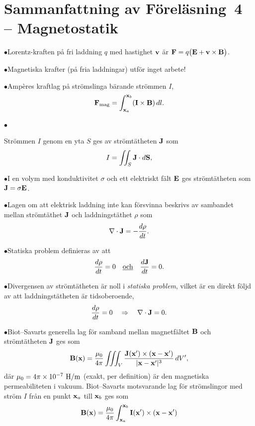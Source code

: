 {{{\section{Sammanfattning av F{\"o}rel{\"a}sning~4 -- Magnetostatik}
\item{$\bullet$}{Lorentz-kraften p{\aa} fri laddning $q$ med hastighet
  ${\bf v}$ {\"a}r ${\bf F}=q\big({\bf E}+{\bf v}\times{\bf B}\big)$.}
\item{$\bullet$}{Magnetiska krafter (p{\aa} fria laddningar) utf{\"o}r
  inget arbete!}
\item{$\bullet$}{Amp{\`e}res kraftlag p{\aa} str{\"o}mslinga b{\"a}rande
  str{\"o}mmen $I$,
  $$
    {\bf F}_{\rm mag}=\int^{{\bf x}_b}_{{\bf x}_a} ({\bf I}\times{\bf B})\,dl.
  $$}
\item{$\bullet$}{Str{\"o}mmen $I$ genom en yta $S$ ges av str{\"o}mt{\"a}theten
  ${\bf J}$ som
  $$
    I=\iint_S {\bf J}\cdot d{\bf S},
  $$
\item{$\bullet$}{I en volym med konduktivitet $\sigma$ och ett elektriskt
  f{\"a}lt ${\bf E}$ ges str{\"o}mt{\"a}theten som ${\bf J}=\sigma{\bf E}$.}
\item{$\bullet$}{Lagen om att elektrisk laddning inte kan f{\"o}rsvinna
  beskrivs av sambandet mellan str{\"o}mt{\"a}thet ${\bf J}$ och
  laddningst{\"a}thet $\rho$ som
  $$
    \nabla\cdot{\bf J}=-{{d\rho}\over{dt}}.
  $$}
\item{$\bullet$}{Statiska problem definieras av att
  $$
    {{d\rho}\over{dt}}=0\quad\underline{\hbox{och}}\quad{{d{\bf J}}\over{dt}}=0.
  $$}
\item{$\bullet$}{Divergensen av str{\"o}mt{\"a}theten {\"a}r noll i
  {\it statiska problem}, vilket {\"a}r en direkt f{\"o}ljd av att
  laddnings\-t{\"a}t\-heten {\"a}r tidsoberoende,
  $$
    {{d\rho}\over{dt}}=0\quad\Rightarrow\quad\nabla\cdot{\bf J}=0.
  $$}
\item{$\bullet$}{Biot--Savarts generella lag f{\"o}r samband mellan
  magnetf{\"a}ltet ${\bf B}$ och str{\"o}mt{\"a}theten ${\bf J}$ ges som
  $$
    {\bf B}({\bf x})={{\mu_0}\over{4\pi}}\iiint_V
        {{{\bf J}({\bf x}')\times({\bf x}-{\bf x}')}
          \over{|{\bf x}-{\bf x}'|^3}}\,dV',
  $$
  d{\"a}r $\mu_0=4\pi\times10^{-7}\ {\rm H}/{\rm m}$ (exakt, per definition)
  {\"a}r den magnetiska permeabiliteten i vakuum. Biot--Savarts motsvarande
  lag f{\"o}r str{\"o}mslingor med str{\"o}m $I$ fr{\aa}n en punkt ${\bf x}_a$
  till ${\bf x}_b$ ges som
  $$
    {\bf B}({\bf x})={{\mu_0}\over{4\pi}}\int^{{\bf x}_b}_{{\bf x}_a}
        {{{\bf I}({\bf x}')\times({\bf x}-{\bf x}')}
}$$}}}}}
